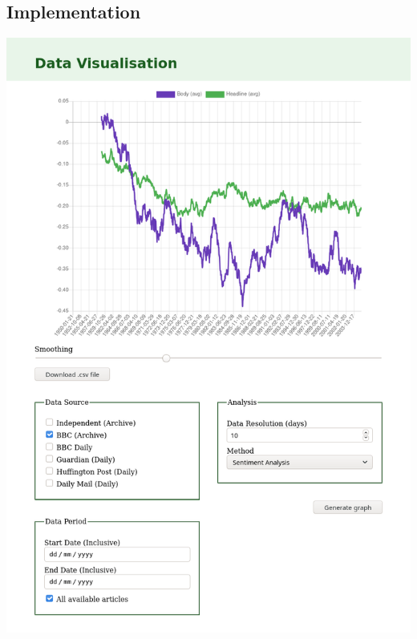 \documentclass[12pt,a4paper]{article}
\begin{document}
\begin{appendices}
\begin{subappendices}
\subsection{Implementation} \label{app:vis-implementation}
\includegraphics[width=\linewidth]{../visualisation/implementation.png}


\end{subappendices}
\end{appendices}
\end{document}
